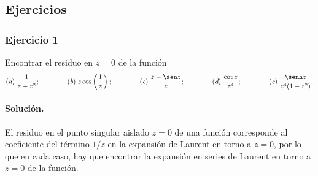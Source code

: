 \documentclass[a4paper]{report}
\begin{document}
\subsection*{Ejercicios}

\subsubsection*{Ejercicio 1}

Encontrar el residuo en \(z=0\) de la función 
\[
 (\textit{a})\;\frac{1}{z+z^2};\qquad\qquad (\textit{b})\;z\cos\left(\frac{1}{z}\right);\qquad\qquad
 (\textit{c})\;\frac{z-\sen z}{z};\qquad\qquad (\textit{d})\;\frac{\cot z}{z^4};\qquad\qquad
 (\textit{e})\;\frac{\senh z}{z^4(1-z^2)}.
\]

\paragraph{Solución.}

El residuo en el punto singular aislado \(z=0\) de una función corresponde al coeficiente del término \(1/z\) en la expansión de Laurent en torno a \(z=0\), por lo que en cada caso, hay que encontrar la expansión en series de Laurent en torno a \(z=0\) de la función.
\end{document}
